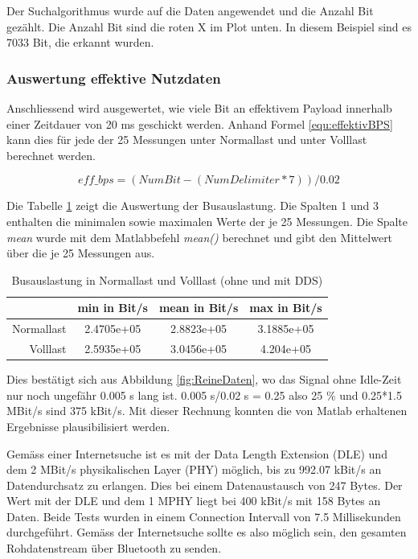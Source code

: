 Der Suchalgorithmus wurde auf die Daten angewendet und die Anzahl Bit gezählt. Die Anzahl Bit sind die roten X im Plot unten. In diesem Beispiel sind es 7033 Bit, die erkannt wurden. 

\subsubsection{Auswertung effektive Nutzdaten}
Anschliessend wird ausgewertet, wie viele Bit an effektivem Payload innerhalb einer Zeitdauer von 20 ms geschickt werden. Anhand Formel \ref{equ:effektivBPS} kann dies  für jede der 25 Messungen unter Normallast und unter Volllast berechnet werden.

\begin{equation}
    eff\_bps = (NumBit - (NumDelimiter * 7)) / 0.02
    \label{equ:effektivBPS}
\end{equation}


 Die Tabelle \ref{tab:Busauslastung} zeigt die Auswertung  der Busauslastung. Die Spalten 1 und 3 enthalten die minimalen sowie maximalen Werte der je 25 Messungen. Die Spalte \textit{mean} wurde mit dem Matlabbefehl \textit{mean()} berechnet und gibt den Mittelwert über die je 25 Messungen aus. 

\begin{table}[H]
    \centering
    \begin{tabular}{r|c|c|c}
        & min in Bit/s & mean in Bit/s & max in Bit/s\\ 
        \hline
        Normallast & 2.4705e+05 & 2.8823e+05 & 3.1885e+05\\
        \hline
        Volllast & 2.5935e+05 & 3.0456e+05 & 4.204e+05 \\
    \end{tabular}
    \caption{Busauslastung in Normallast und Volllast (ohne und mit DDS) }
    \label{tab:Busauslastung}
\end{table}

Dies bestätigt sich aus Abbildung \ref{fig:ReineDaten}, wo das Signal ohne Idle-Zeit nur noch ungefähr 0.005 s lang ist. 0.005 s/0.02 s = 0.25  also 25 \% und 0.25*1.5 MBit/s sind 375 kBit/s. Mit dieser Rechnung konnten die von Matlab erhaltenen Ergebnisse plausibilisiert werden. 

Gemäss einer Internetsuche ist es mit der Data Length Extension (DLE) und dem 2 MBit/s physikalischen Layer (PHY) möglich, bis zu 992.07 kBit/s an Datendurchsatz zu erlangen. Dies bei einem Datenaustausch von 247 Bytes. Der Wert mit der DLE und dem 1 MPHY liegt bei 400 kBit/s mit 158 Bytes an Daten. Beide Tests wurden in einem Connection Intervall von 7.5 Millisekunden durchgeführt.\cite{MAX_THOUPUT_BLE} 
Gemäss der Internetsuche sollte es also möglich sein, den gesamten Rohdatenstream über Bluetooth zu senden. 

